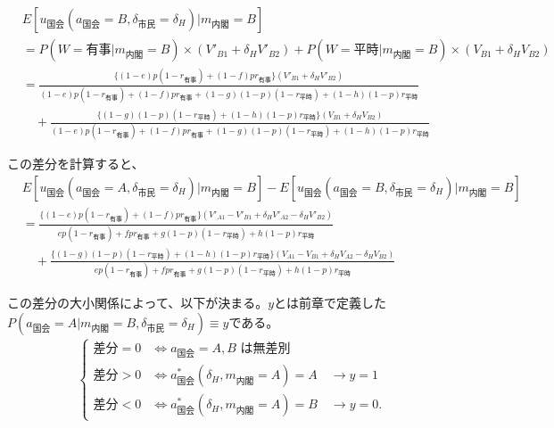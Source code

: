 \documentclass[main.tex]{subfiles}
\begin{document}
\begin{align*}
    & E[u_{国会}(a_{国会}=B, \delta_{市民}=\delta_H) | m_{内閣} = B  ]\\[0.5em]
    &= P(W=有事 | m_{内閣}=B) × (V'_{B1} + \delta_H V'_{B2}) + P(W=平時 | m_{内閣}=B) × (V_{B1} + \delta_H V_{B2})\\[0.5em]
    &= \frac{ \{(1-e)p(1-r_{有事}) +  (1-f)pr_{有事}\}(V'_{B1} + \delta_H V'_{B2})  }{ (1-e)p(1-r_{有事}) + (1-f)pr_{有事} + (1-g)(1-p)(1-r_{平時}) + (1-h)(1-p)r_{平時} }\\[1em]
    &\quad + \frac{ \{(1-g)(1-p)(1-r_{平時}) + (1-h)(1-p)r_{平時}\}(V_{B1} + \delta_H V_{B2}) }{ (1-e)p(1-r_{有事}) + (1-f)pr_{有事} + (1-g)(1-p)(1-r_{平時}) + (1-h)(1-p)r_{平時} }
\end{align*}

\bigskip
この差分を計算すると、
\begin{align*}
    & E[u_{国会}(a_{国会}=A, \delta_{市民}=\delta_H) | m_{内閣} = B  ] - E[u_{国会}(a_{国会}=B, \delta_{市民}=\delta_H) | m_{内閣} = B  ]\\[1em]
    &= \frac{ \{(1-e)p(1-r_{有事}) +  (1-f)pr_{有事}\}(V'_{A1} -V'_{B1} + \delta_H V'_{A2} - \delta_H V'_{B2})  }{ ep(1-r_{有事}) + fpr_{有事} + g(1-p)(1-r_{平時}) + h(1-p)r_{平時} }\\[1em]
    &\quad + \frac{ \{(1-g)(1-p)(1-r_{平時}) + (1-h)(1-p)r_{平時}\}(V_{A1} - V_{B1} + \delta_H V_{A2} - \delta_H V_{B2} ) }{ ep(1-r_{有事}) + fpr_{有事} + g(1-p)(1-r_{平時}) + h(1-p)r_{平時} }
\end{align*}

\bigskip
この差分の大小関係によって、以下が決まる。$y$とは前章で定義した\\
$P(a_{国会} = A| m_{内閣} = B, \delta_{市民} = \delta_H ) \equiv y$である。
\begin{align*}
    \begin{cases}
         \text{差分} = 0 &\Leftrightarrow \text{$a_{\text{国会}} = A, B$ は無差別} \\
         \text{差分} > 0 &\Leftrightarrow a^*_{\text{国会}}(\delta_H, m_{\text{内閣}} = A) = A \quad\rightarrow y = 1 \\
         \text{差分} < 0 &\Leftrightarrow a^*_{\text{国会}}(\delta_H, m_{\text{内閣}} = A) = B \quad\rightarrow y = 0.
    \end{cases}
\end{align*}


\theendnotes
\end{document}
